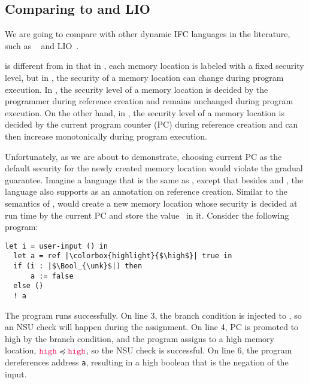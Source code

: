 {\subsection{Comparing \DynIFC to \laminfo and LIO}
\label{sec:compare-dynifc}

We are going to compare \DynIFC with other dynamic IFC languages in the
literature, such as \laminfo~\parencite{austin2009efficient} and
LIO~\parencite{STEFAN:2017ta}.

\DynIFC is different from \laminfo in that in \DynIFC, each memory location is
labeled with a fixed security level, but in \laminfo, the security of a memory
location can change during program execution. In \DynIFC, the security level of
a memory location is decided by the programmer during reference creation and
remains unchanged during program execution. On the other hand, in \laminfo, the
security level of a memory location is decided by the current program counter
(PC) during reference creation and can then increase monotonically during
program execution.

Unfortunately, as we are about to demonstrate, choosing current PC as the
default security for the newly created memory location would violate the gradual
guarantee. Imagine a language that is the same as \Surface, except that besides
\low and \high, the language also supports \unk as an annotation on reference
creation. Similar to the semantics of \laminfo,
 would create a new memory location
whose security is decided at run time by the current PC and store the value
\true~in it. Consider the following program:

\noindent
{}
\begin{lstlisting}[style=tt,basicstyle=\ttfamily\footnotesize]
  let i = user-input () in
  let a = ref |\colorbox{highlight}{$\high$}| true in
  if (i : |$\Bool_{\unk}$|) then
      a := false
  else ()
  ! a
\end{lstlisting}

\noindent The  program runs successfully. On line 3, the
branch condition is injected to \unk, so an NSU check will happen during the
assignment. On line 4, PC is promoted to high by the branch condition, and the
program assigns to a high memory location, $\high \preccurlyeq \high$, so the
NSU check is successful. On line 6, the program dereferences address \texttt{a},
resulting in a high boolean that is the negation of the input.

}
